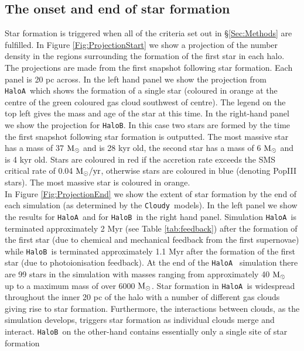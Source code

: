 \documentclass[graphics, twocolumn, usenatbib]{mn2e}
\newcommand{\cloudy}{\texttt{Cloudy~}}
\newcommand{\msolar} {$\rm{M_{\odot}}~$}
\newcommand{\msolarc} {$\rm{M_{\odot}}$}
\newcommand{\msolaryrc} {$\rm{M_{\odot}/yr}$}
\newcommand{\ha} {\texttt{HaloA~}}
\newcommand{\hb} {\texttt{HaloB~}}
\newcommand{\hbc} {\texttt{HaloB}}
\begin{document}



\subsection{The onset and end of star formation}
Star formation is triggered when all of the criteria set out in \S \ref{Sec:Methods} are
fulfilled. In Figure \ref{Fig:ProjectionStart} we show a projection of the number density in the
regions surrounding the formation of the first star in each halo. The projections are made from the
first snapshot following star formation. Each panel is 20 pc across. In the left hand panel we
show the projection from \ha which shows the formation of a single star (coloured in orange
at the centre of the green coloured gas cloud southwest of centre). The legend on the top left gives the mass and
age of the star at this time.
In the right-hand panel we show the projection for \hbc. In this case two stars are formed by the time the first
snapshot following star formation is outputted. The most massive star has a mass of 37 \msolar and is 28 kyr old,
the second star has a mass of 6 \msolar and is 4 kyr old. Stars are coloured in red if the
accretion rate exceeds the SMS critical rate of 0.04 \msolaryrc, otherwise 
stars are coloured in blue (denoting PopIII stars). The most massive star is
coloured in orange. \\
\indent In Figure \ref{Fig:ProjectionEnd} we show the extent of star formation by the end of each
simulation (as determined by the \cloudy models). In the left panel we show the results for \ha and
for \hb in the right hand panel. Simulation \ha is terminated approximately 2 Myr (see Table \ref{tab:feedback})
after the formation of the first
star (due to chemical and mechanical feedback from the first supernovae) while \hb is terminated approximately
1.1 Myr after the formation of the first star (due to photoionisation feedback). At the end of the \ha
simulation there are 99 stars in the simulation with masses ranging from approximately 40 \msolar
up to a maximum mass of over 6000 \msolarc.  Star formation in \ha is widespread throughout the
inner 20 pc of the halo with a number of different gas clouds giving rise to star formation. Furthermore, the interactions between clouds, as the simulation develops, triggers star formation as individual clouds
merge and interact. \hb on the other-hand contains essentially only a single site of star formation
\end{document}
